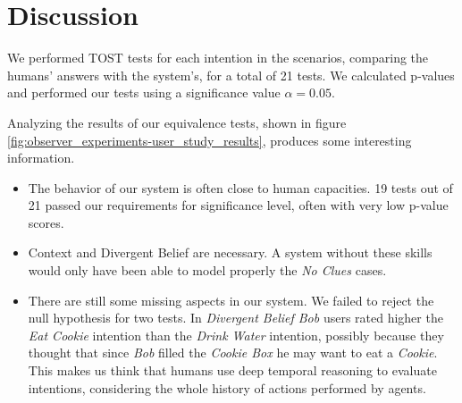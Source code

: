 \section{Discussion}
\label{sec:observer_experiment-discussion}
We performed TOST tests for each intention in the scenarios, comparing the humans' answers with the system's, for a total of 21 tests. We calculated p-values and performed our tests using a significance value $\alpha=0.05$.

Analyzing the results of our equivalence tests, shown in figure \ref{fig:observer_experiments-user_study_results}, produces some interesting information.
\begin{itemize}
\item The behavior of our system is often close to human capacities. 19 tests out of 21 passed our requirements for significance level, often with very low p-value scores. 
\item Context and Divergent Belief are necessary. A system without these skills would only have been able to model properly the \textit{No Clues} cases. 
\item There are still some missing aspects in our system. We failed to reject the null hypothesis for two tests. In \textit{Divergent Belief Bob} users rated higher the \textit{Eat Cookie} intention than the \textit{Drink Water} intention, possibly because they thought that since \textit{Bob} filled the \textit{Cookie Box} he may want to eat a \textit{Cookie}. This makes us think that humans use deep temporal reasoning to evaluate intentions, considering the whole history of actions performed by agents.  
\end{itemize}
